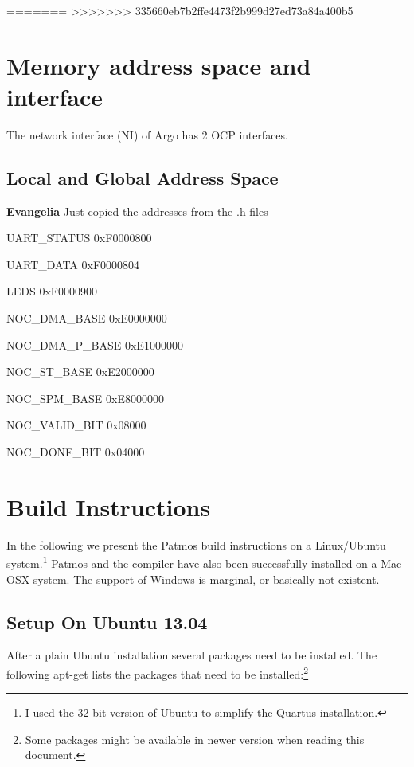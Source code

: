 \documentclass[a4paper,fontsize=10pt,twoside,DIV15,BCOR12mm,headinclude=true,footinclude=false,pagesize,bibtotoc]{scrbook}
\newcommand{\comment}[3]{

\textsf{\textbf{#1}} {\color{#3}#2}}
\newcommand{\eva}[1]{\comment{Evangelia}{#1}{Green}}
\begin{document}
=======
>>>>>>> 335660eb7b2ffe4473f2b999d27ed73a84a400b5
\chapter{Memory address space and interface}
The network interface (NI) of Argo has 2 OCP\cite{ocp:spec} interfaces.


\section{Local and Global Address Space}

\eva{Just copied the addresses from the .h files}
\begin{enumeration}
\item UART\_STATUS	0xF0000800
\item UART\_DATA	0xF0000804
\item LEDS   		0xF0000900

\item NOC\_DMA\_BASE	0xE0000000
\item NOC\_DMA\_P\_BASE	0xE1000000
\item NOC\_ST\_BASE	0xE2000000
\item NOC\_SPM\_BASE	0xE8000000
\item NOC\_VALID\_BIT	0x08000
\item NOC\_DONE\_BIT	0x04000
\end{enumeration}



\chapter{Build Instructions}

In the following we present the Patmos build instructions on a Linux/Ubuntu
system.\footnote{I used the 32-bit version of Ubuntu to simplify the Quartus installation.}
Patmos and the compiler have also been successfully installed on a Mac OSX
system. The support of Windows is marginal, or basically not existent.


\section{Setup On Ubuntu 13.04}

After a plain Ubuntu installation several packages need to be installed.
The following apt-get lists the packages that need to be
installed:\footnote{Some packages might be available in newer version
when reading this document.}
\end{document}
